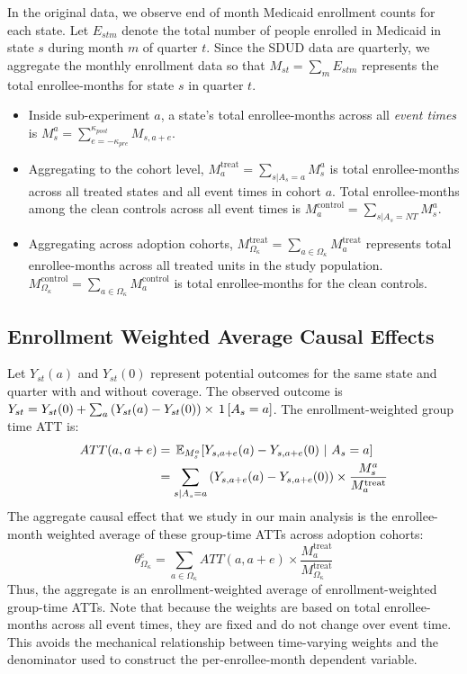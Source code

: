 In the original data, we observe end of month Medicaid enrollment counts for each state. Let $E_{stm}$ denote the total number of people enrolled in Medicaid in state $s$ during month $m$ of quarter $t$. Since the SDUD data are quarterly, we aggregate the monthly enrollment data so that $M_{st} = \sum_{m} E_{stm}$ represents the total enrollee-months for state $s$ in quarter $t$.
\begin{itemize}
    \item Inside sub-experiment $a$, a state's total enrollee-months across all \emph{event times} is $M_s^{a} = \sum_{e = -\kappa_{pre}}^{\kappa_{post}} M_{s,a+e}$.

    \item Aggregating to the cohort level, $M_{a}^{\text{treat}} = \sum_{s | A_s = a} M_{s}^{a}$ is total enrollee-months across all treated states and all event times in cohort $a$. Total enrollee-months among the clean controls across all event times is $M_{a}^{\text{control}} = \sum_{s | A_s = NT} M_{s}^{a}$.

    \item Aggregating across adoption cohorts, $M_{\Omega_{\kappa}}^{\text{treat}} = \sum_{a \in \Omega_{\kappa}} M_{a}^{\text{treat}}$ represents total enrollee-months across all treated units in the study population. $M_{\Omega_{\kappa}}^{\text{control}} = \sum_{a \in \Omega_{\kappa}} M_{a}^{\text{control}}$ is total enrollee-months for the clean controls.
\end{itemize}

\subsection{Enrollment Weighted Average Causal Effects}

Let $Y_{st}(a)$ and $Y_{st}(0)$ represent potential outcomes for the same state and quarter with and without coverage. The observed outcome is $Y_{st} = Y_{st}(0) +\sum_a \bp{Y_{st}(a)-Y_{st}(0)} \times \one{A_s = a}$. The enrollment-weighted group time ATT is:
%
\begin{align*}
ATT(a,a+e) &= \E[M_s^{a}]{Y_{s,a+e}(a) - Y_{s,a+e}(0)}{A_s = a} \\
&= \sum_{s | A_s = a} \bp{Y_{s,a+e}(a) - Y_{s,a+e}(0)} \times \frac{M_s^{a}}{M_{a}^{\text{treat}}}
\end{align*}
%
The aggregate causal effect that we study in our main analysis is the enrollee-month weighted average of these group-time ATTs across adoption cohorts:
%
\begin{equation*}
  \theta_{\Omega_{\kappa}}^{e} = \sum_{a \in \Omega_{\kappa}} ATT(a, a+e) \times \frac{M_a^{\text{treat}}}{M_{\Omega_{\kappa}}^{\text{treat}}}
\end{equation*}
%
Thus, the aggregate is an enrollment-weighted average of enrollment-weighted group-time ATTs. Note that because the weights are based on total enrollee-months across all event times, they are fixed and do not change over event time. This avoids the mechanical relationship between time-varying weights and the denominator used to construct the per-enrollee-month dependent variable.


